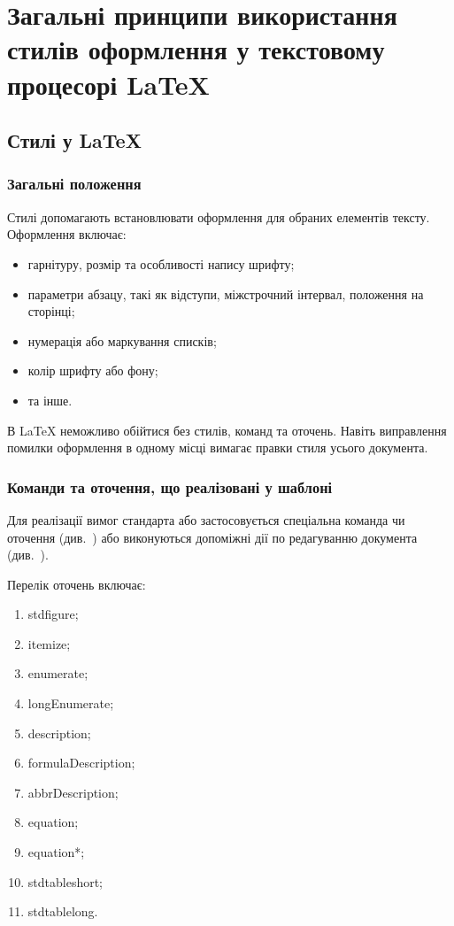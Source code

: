 \section{Загальні принципи використання стилів оформлення у текстовому процесорі \LaTeX{}}
\subsection{Стилі у \LaTeX{}}
\subsubsection{Загальні положення}

Стилі допомагають встановлювати оформлення для обраних елементів тексту. Оформлення включає:
\begin{itemize}
\item гарнітуру, розмір та особливості напису шрифту;
\item параметри абзацу, такі як відступи, міжстрочний інтервал, положення на сторінці;
\item нумерація або маркування списків;
\item колір шрифту або фону;
\item та інше.
\end{itemize}

В \LaTeX{} неможливо обійтися без стилів, команд та оточень. Навіть виправлення
помилки оформлення в одному місці вимагає правки стиля усього документа.

\subsubsection{Команди та оточення, що реалізовані у шаблоні}

Для реалізації вимог стандарта або застосовується спеціальна команда чи оточення
(див.~\label{sec:auto}) або виконуються допоміжні дії по редагуванню документа
(див.~\label{sec:manual}). 

Перелік оточень включає:
\begin{enumerate}
\item stdfigure;
\item itemize;
\item enumerate;
\item longEnumerate;
\item description;
\item formulaDescription;
\item abbrDescription;
\item equation;
\item equation*;
\item stdtableshort;
\item stdtablelong.
\end{enumerate}

